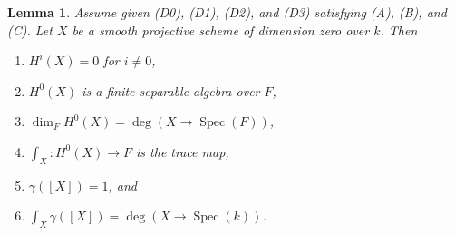 \documentclass{stacks-project}
\theoremstyle{plain}
\newtheorem{lemma}[subsection]{Lemma}
\theoremstyle{definition}
\theoremstyle{remark}
\numberwithin{equation}{subsection}
\def\Spec{\mathop{\mathrm{Spec}}}
\begin{document}
\begin{lemma}
\label{lemma-dim-0}
Assume given (D0), (D1), (D2), and (D3) satisfying (A), (B), and (C).
Let $X$ be a smooth projective scheme of dimension zero over $k$.
Then
\begin{enumerate}
\item $H^i(X) = 0$ for $i \not = 0$,
\item $H^0(X)$ is a finite separable algebra over $F$,
\item $\dim_F H^0(X) = \deg(X \to \Spec(F))$,
\item $\int_X : H^0(X) \to F$ is the trace map,
\item $\gamma([X]) = 1$, and
\item $\int_X \gamma([X]) = \deg(X \to \Spec(k))$.
\end{enumerate}
\end{lemma}
\end{document}
